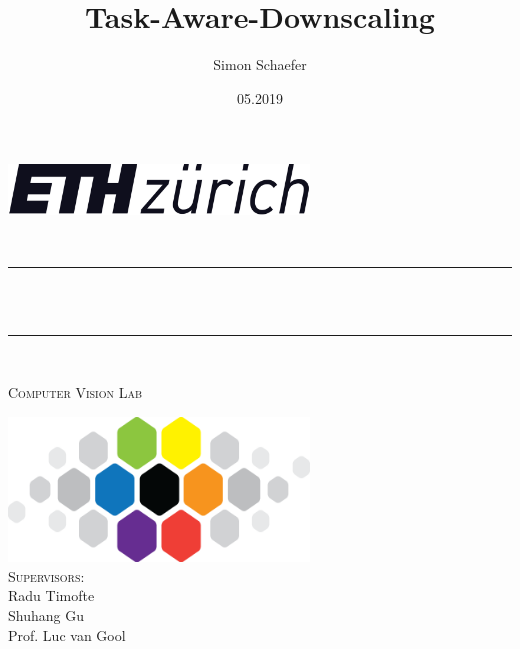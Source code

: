 \documentclass[12pt]{article}
\title{Task-Aware-Downscaling}
\author{Simon Schaefer}
\date{05.2019}
\makeatletter
\let\thetitle\@title
\let\theauthor\@author
\makeatother
\begin{document}
\begin{titlepage}
	\centering

  \includegraphics[width=8cm]{eth.png} \\[2cm]

  \begin{center}
  {\Large \theauthor} \\[1cm]
  \end{center}

	\rule{\linewidth}{0.2 mm} \\[0.4 cm]
	{ \huge \bfseries \thetitle}\\
	\rule{\linewidth}{0.2 mm} \\[1.5 cm]

  \vspace*{0.5 cm}
  \begin{center}
  \textsc{\Large Computer Vision Lab} \\[1cm]
  \end{center}

	\includegraphics[width=8cm]{cvl.png} \\[2cm]

  {\Large \textsc{Supervisors:} \\ Radu Timofte \\ Shuhang Gu \\ Prof. Luc van Gool}

\end{titlepage}
\end{document}
